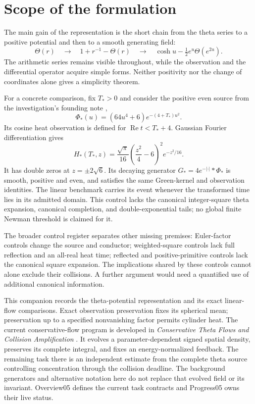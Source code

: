 \documentclass[11pt]{article}
\theoremstyle{remark}
\numberwithin{equation}{section}
\begin{document}
\section{Scope of the formulation}
\label{sec:scope}

The main gain of the representation is the short chain from the theta
series to a positive potential and then to a smooth generating field:
\[
 \Theta(r)\quad\longrightarrow\quad
 1+r^{-1}-\Theta(r)\quad\longrightarrow\quad
 \cosh u-\tfrac12e^u\Theta(e^{2u}).
\]
The arithmetic series remains visible throughout, while the observation
and the differential operator acquire simple forms. Neither positivity
nor the change of coordinates alone gives a simplicity theorem.

For a concrete comparison, fix \(T_*>0\) and consider the positive
even source from the investigation's founding note \cite[Note01,
Section~7]{Archive},
\begin{equation}\label{eq:control-source}
 \Phi_*(u)=(64u^4+6)e^{-(4+T_*)u^2}.
\end{equation}
Its cosine heat observation is defined for \(\operatorname{Re}t<T_*+4\).
Gaussian Fourier differentiation gives
\begin{equation}\label{eq:control-event}
 H_*(T_*,z)=\frac{\sqrt\pi}{16}
 \left(\frac{z^2}{4}-6\right)^2e^{-z^2/16}.
\end{equation}
It has double zeros at \(z=\pm2\sqrt6\). Its decaying generator
\(G_*=4e^{-|\cdot|}*\Phi_*\) is smooth, positive and even, and
satisfies the same Green-kernel and observation identities. The linear
benchmark carries its event whenever the transformed time lies in its
admitted domain. This control lacks the canonical integer-square theta
expansion, canonical completion, and double-exponential tails; no global
finite Newman threshold is claimed for it.

The broader control register \cite{Controls} separates other missing
premises: Euler-factor controls change the source and conductor;
weighted-square controls lack full reflection and an all-real heat time;
reflected and positive-primitive controls lack the canonical square
expansion. The implications shared by these controls cannot alone
exclude their collisions. A further argument would need a quantified
use of additional canonical information.

This companion records the theta-potential representation and its exact
linear-flow comparisons. Exact observation preservation fixes its
spherical mean; preservation up to a specified nonvanishing factor
permits cylinder heat. The current conservative-flow program is developed
in \emph{Conservative Theta Flows and Collision Amplification}
\cite{ConservativeFlow}. It evolves a parameter-dependent signed spatial
density, preserves its complete integral, and fixes an energy-normalized
feedback. The remaining task there is an independent estimate from the
complete theta source controlling concentration through the collision
deadline. The background generators and alternative notation here do not
replace that evolved field or its invariant. Overview05 defines the
current task contracts and Progress05 owns their live status.
\end{document}
